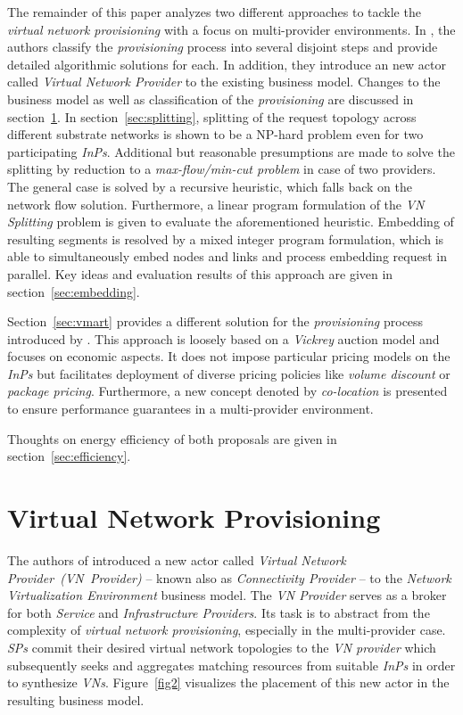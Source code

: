 \documentclass[prodmode,acmtomccap]{acmlarge}
\begin{document}
The remainder of this paper analyzes two different approaches to tackle the \emph{virtual network provisioning} with a focus on multi-provider environments.
In , the authors classify the \emph{provisioning} process into several disjoint steps and provide detailed algorithmic solutions for each.
In addition, they introduce an new actor called \emph{Virtual Network Provider} to the existing business model. Changes to the business model as well as
classification of the \emph{provisioning} are discussed in section~\ref{sec:provisioning}.
In section~\ref{sec:splitting}, splitting of the request topology across different substrate networks is shown to be a NP-hard problem even for two participating \emph{InPs}. 
Additional but reasonable presumptions are made to solve the splitting by reduction to a \emph{max-flow/min-cut problem} in case of two providers.
The general case is solved by a recursive heuristic, which falls back on the network flow solution. Furthermore, a linear program formulation of the \emph{VN Splitting} problem
is given to evaluate the aforementioned heuristic.
Embedding of resulting segments is resolved by a mixed integer program formulation, which is able to simultaneously embed nodes and links and process embedding request in parallel.
Key ideas and evaluation results of this approach are given in section~\ref{sec:embedding}.

Section~\ref{sec:vmart} provides a different solution for the \emph{provisioning} process introduced by .
This approach is loosely based on a \emph{Vickrey} auction model and focuses on economic aspects. It does not impose particular pricing models on the \emph{InPs} but facilitates
deployment of diverse pricing policies like \emph{volume discount} or \emph{package pricing}. Furthermore, a new concept denoted by \emph{co-location} is presented
to ensure performance guarantees in a multi-provider environment.

Thoughts on energy efficiency of both proposals are given in section~\ref{sec:efficiency}.


\section{Virtual Network Provisioning}
\label{sec:provisioning}
The authors of  introduced a new actor called \emph{Virtual Network Provider~(VN~Provider)} -- known also as \emph{Connectivity Provider} -- 
to the \emph{Network Virtualization Environment} business model. The \emph{VN Provider} serves as a broker for both \emph{Service} and \emph{Infrastructure Providers}.
Its task is to abstract from the complexity of \emph{virtual network provisioning}, especially in the multi-provider case. \emph{SPs} commit their desired virtual network topologies
to the \emph{VN provider} which subsequently seeks and aggregates matching resources from suitable \emph{InPs} in order to synthesize \emph{VNs}.
Figure~\ref{fig2} visualizes the placement of this new actor in the resulting business model.
\end{document}
